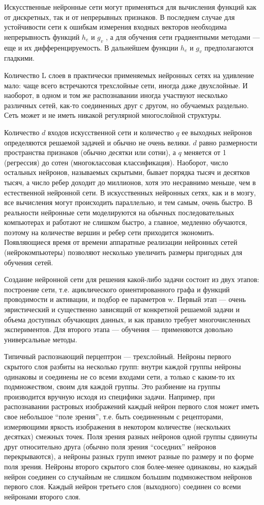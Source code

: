 \documentclass[a4paper,12pt]{report}
\numberwithin{equation}{section}
\begin{document}
Искусственные нейронные сети могут применяться для вычисления функций как от
дискретных, так и от непрерывных признаков. В последнем случае для устойчивости
сети к ошибкам измерения входных векторов необходима непрерывность функций $h_e$
и $g_v$ , а для обучения сети градиентными методами — еще и их
дифференцируемость. В дальнейшем функции $h_e$ и $g_v$ предполагаются гладкими.


Количество L слоев в практически применяемых нейронных сетях на удивление мало:
чаще всего встречаются трехслойные сети, иногда даже двухслойные. И наоборот, в
одном и том же распознавании иногда участвуют несколько различных сетей, как-то
соединенных друг с другом, но обучаемых раздельно. Сеть может и не иметь никакой
регулярной многослойной структуры.


Количество $d$ входов искусственной сети и количество $q$ ее выходных нейронов
определяются решаемой задачей и обычно не очень велики. $d$ равно размерности
пространства признаков (обычно десятки или сотни), а $q$ меняется от 1
(регрессия) до сотен (многоклассовая классификация). Наоборот, число остальных
нейронов, называемых скрытыми, бывает порядка тысяч и десятков тысяч, а число
ребер доходит до миллионов, хотя это несравнимо меньше, чем в естественной
нейронной сети. В искусственных нейронных сетях, как и в мозгу, все вычисления
могут происходить параллельно, и тем самым, очень быстро. В реальности нейронные
сети моделируются на обычных последовательных компьютерах и работают не слишком
быстро, а главное, медленно обучаются, поэтому на количестве вершин и ребер сети
приходится экономить. Появляющиеся время от времени аппаратные реализации
нейронных сетей (нейрокомпьютеры) позволяют несколько увеличить размеры
пригодных для обучения сетей.


Создание нейронной сети для решения какой-либо задачи состоит из двух этапов:
построение сети, т.е. ациклического ориентированного графа и функций
проводимости и активации, и подбор ее параметров w. Первый этап — очень
эвристический и существенно зависящий от конкретной решаемой задачи и объема
доступных обучающих данных, и как правило требует многочисленных
экспериментов. Для второго этапа — обучения — применяются довольно универсальные
методы.


Типичный распознающий перцептрон — трехслойный. Нейроны первого скрытого слоя
разбиты на несколько групп: внутри каждой группы нейроны одинаковы и соединены
не со всеми входами сети, а только с каким-то их подмножеством, своим для каждой
группы. Это разбиение на группы производится вручную исходя из специфики
задачи. Например, при распознавании растровых изображений каждый нейрон первого
слоя может иметь свое небольшое “поле зрения”, т.е. быть соединенным с
рецепторами, измеряющими яркость изображения в некотором количестве (нескольких
десятках) смежных точек. Поля зрения разных нейронов одной группы сдвинуты друг
относительно друга (обычно поля зрения “соседних” нейронов перекрываются), а
нейроны разных групп имеют разные по размеру и по форме поля зрения. Нейроны
второго скрытого слоя более-менее одинаковы, но каждый нейрон соединен со
случайным не слишком большим подмножеством нейронов первого слоя. Каждый нейрон
третьего слоя (выходного) соединен со всеми нейронами второго слоя.
\end{document}
